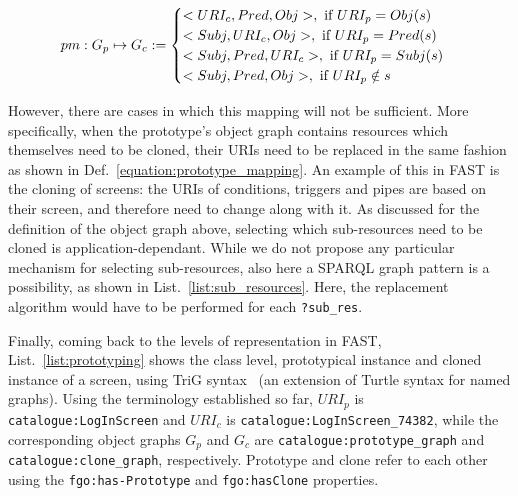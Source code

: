 \documentclass{article}
\begin{document}
\begin{equation}
	\label{equation:prototype_mapping}
pm: G_p \mapsto G_c := \begin{cases}
<URI_c, Pred, Obj >, \textnormal{ if } URI_p = Obj(s) \\
<Subj, URI_c, Obj >, \textnormal{ if } URI_p = Pred(s) \\
<Subj, Pred, URI_c >, \textnormal{ if } URI_p = Subj(s) \\
<Subj, Pred, Obj >, \textnormal{ if } URI_p \notin s
\end{cases}
\end{equation}

However, there are cases in which this mapping will not be sufficient. More specifically, when the prototype's object graph contains resources which themselves need to be cloned, their URIs need to be replaced in the same fashion as shown in Def.~\ref{equation:prototype_mapping}. An example of this in FAST is the cloning of screens: the URIs of conditions, triggers and pipes are based on their screen, and therefore need to change along with it. As discussed for the definition of the object graph above, selecting which sub-resources need to be cloned is application-dependant. While we do not propose any particular mechanism for selecting sub-resources, also here a SPARQL graph pattern is a possibility, as shown in List.~\ref{list:sub_resources}. Here, the replacement algorithm would have to be performed for each \texttt{?sub\_res}.

\singlespacing
{}
\begin{figure}
	
\end{figure}
\doublespacing


Finally, coming back to the levels of representation in FAST, List.~\ref{list:prototyping} shows the class level, prototypical instance and cloned instance of a screen, using TriG syntax~\cite{bizer2004trig} (an extension of Turtle syntax for named graphs). Using the terminology established so far, $URI_p$ is \texttt{catalogue:LogInScreen} and $URI_c$ is \texttt{catalogue:LogInScreen\_74382}, while the corresponding object graphs $G_p$ and $G_c$ are \texttt{catalogue:prototype\_graph} and \texttt{catalogue:clone\_graph}, respectively. Prototype and clone refer to each other using the \texttt{fgo:has-Prototype} and \texttt{fgo:hasClone} properties.
\end{document}
